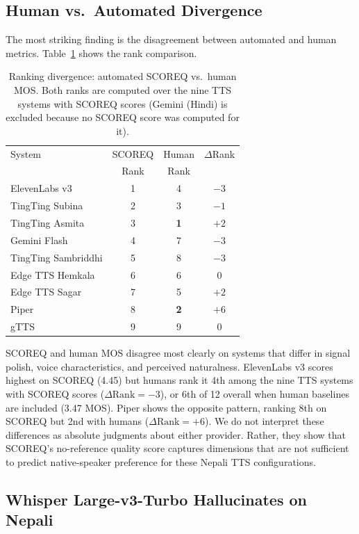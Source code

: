 \documentclass[11pt]{article}
\begin{document}
\subsection{Human vs.\ Automated Divergence}

The most striking finding is the disagreement between automated and human metrics. Table~\ref{tab:divergence} shows the rank comparison.

\begin{table}[t]
\centering
\caption{Ranking divergence: automated SCOREQ vs.\ human MOS. Both ranks are computed over the nine TTS systems with SCOREQ scores (Gemini (Hindi) is excluded because no SCOREQ score was computed for it).}
\label{tab:divergence}
\begin{tabular}{lccc}
\toprule
System & SCOREQ & Human & $\Delta$Rank \\
 & Rank & Rank & \\
\midrule
ElevenLabs v3 & 1 & 4 & $-3$ \\
TingTing Subina & 2 & 3 & $-1$ \\
TingTing Asmita & 3 & \textbf{1} & $+2$ \\
Gemini Flash & 4 & 7 & $-3$ \\
TingTing Sambriddhi & 5 & 8 & $-3$ \\
Edge TTS Hemkala & 6 & 6 & $0$ \\
Edge TTS Sagar & 7 & 5 & $+2$ \\
Piper & 8 & \textbf{2} & $+6$ \\
gTTS & 9 & 9 & $0$ \\
\bottomrule
\end{tabular}
\end{table}

SCOREQ and human MOS disagree most clearly on systems that differ in signal polish, voice characteristics, and perceived naturalness. ElevenLabs v3 scores highest on SCOREQ (4.45) but humans rank it 4th among the nine TTS systems with SCOREQ scores ($\Delta\text{Rank} = -3$), or 6th of 12 overall when human baselines are included (3.47 MOS). Piper shows the opposite pattern, ranking 8th on SCOREQ but 2nd with humans ($\Delta\text{Rank} = +6$). We do not interpret these differences as absolute judgments about either provider. Rather, they show that SCOREQ's no-reference quality score captures dimensions that are not sufficient to predict native-speaker preference for these Nepali TTS configurations.

\subsection{Whisper Large-v3-Turbo Hallucinates on Nepali}
\label{sec:whisper-large}
\end{document}
